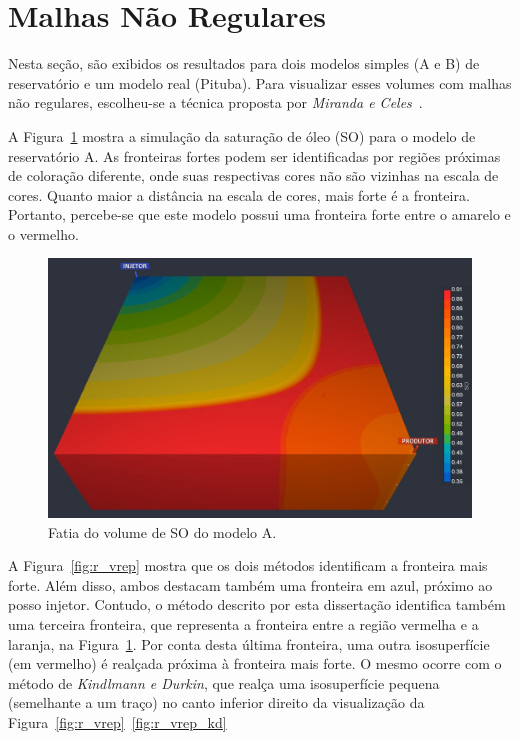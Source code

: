 \clearpage
\section{Malhas Não Regulares}
\label{sec:result.irreg}

	Nesta seção, são exibidos os resultados para dois modelos simples (A e B) de reservatório e um modelo real (Pituba). Para visualizar esses volumes com malhas não regulares, escolheu-se a técnica proposta por \textit{Miranda e Celes}~\cite{miranda}.
	
	A Figura~\ref{fig:box_slice} mostra a simulação da saturação de óleo (SO) para o modelo de reservatório A. As fronteiras fortes podem ser identificadas por regiões próximas de coloração diferente, onde suas respectivas cores não são vizinhas na escala de cores. Quanto maior a distância na escala de cores, mais forte é a fronteira. Portanto, percebe-se que este modelo possui uma fronteira forte entre o amarelo e o vermelho.\\
	
\begin{figure}[h]
	\centering
	\includegraphics[width=1\textwidth]{images/r_vrep_so_slice}
	\caption{Fatia do volume de SO do modelo A.}
	\label{fig:box_slice}
\end{figure}

	A Figura~\ref{fig:r_vrep} mostra que os dois métodos identificam a fronteira mais forte. Além disso, ambos destacam também uma fronteira em azul, próximo ao posso injetor. Contudo, o método descrito por esta dissertação identifica também uma terceira fronteira, que representa a fronteira entre a região vermelha e a laranja, na Figura~\ref{fig:box_slice}. Por conta desta última fronteira, uma outra isosuperfície (em vermelho) é realçada próxima à fronteira mais forte. O mesmo ocorre com o método de \textit{Kindlmann e Durkin}, que realça uma isosuperfície pequena (semelhante a um traço) no canto inferior direito da visualização da Figura~\ref{fig:r_vrep}~\ref{fig:r_vrep_kd}

